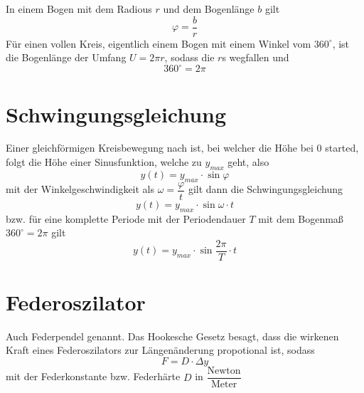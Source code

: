 \documentclass{article}
\begin{document}
In einem Bogen mit dem Radious $r$ und dem Bogenlänge $b$ gilt 
\[
 \varphi = \frac{b}{r} 
\]
Für einen vollen Kreis, eigentlich einem Bogen mit einem Winkel vom $360^\circ$, ist die Bogenlänge der Umfang $U=2 \pi r$, sodass die $r$s wegfallen und
\[
 360^\circ = 2\pi
\]
  
\section{Schwingungsgleichung}
Einer gleichförmigen Kreisbewegung nach ist, bei welcher die Höhe bei $0$ started, folgt die Höhe einer Sinusfunktion, welche zu $y_{max}$ geht, also
\[
 y(t)=y_{max} \cdot \sin{\varphi}
\]
mit der Winkelgeschwindigkeit als $\omega = \dfrac{\varphi}{t}$ gilt dann die Schwingungsgleichung
\[
 \boxed{y(t)=y_{max} \cdot \sin{\omega \cdot t}}
\]
bzw. für eine komplette Periode mit der Periodendauer $T$ mit dem Bogenmaß $360^\circ = 2\pi$ gilt
\[
 \boxed{y(t)=y_{max} \cdot \sin{\frac{2\pi}{T} \cdot t}} 
\]
 
\section{Federoszilator}
Auch Federpendel genannt.\newline 
Das Hookesche Gesetz besagt, dass die wirkenen Kraft eines Federoszilators zur Längenänderung propotional ist, sodass
\[
 F = D \cdot \Delta y
\]
mit der Federkonstante bzw. Federhärte $D$ in $\dfrac{\text{Newton}}{\text{Meter}}$
 
\end{document}
